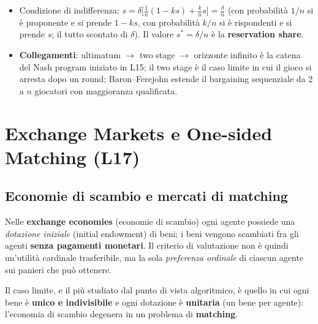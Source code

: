 \documentclass[12pt,a4paper,twoside]{book}
\theoremstyle{plain}
\theoremstyle{definition}
\begin{document}
\begin{itemize}
        approvazione di una maggioranza fissata di $k$ giocatori, sconto comune $\delta$,
        orizzonte infinito, strategie stazionarie. Il proponente offre $s$ a ciascuno dei $k$
        rispondenti.
  \item Condizione di indifferenza: $s=\delta\bigl[\frac1n(1-ks)+\frac kn s\bigr]=\frac{\delta}{n}$
        (con probabilità $1/n$ si è proponente e si prende $1-ks$, con probabilità $k/n$ si
        è rispondenti e si prende $s$; il tutto scontato di $\delta$). Il valore
        $s^*=\delta/n$ è la \textbf{reservation share}.
  \item \textbf{Collegamenti}: ultimatum $\to$ two stage $\to$ orizzonte infinito è la catena
        del Nash program iniziato in L15; il two stage è il caso limite in cui il gioco si
        arresta dopo un round; Baron--Ferejohn estende il bargaining sequenziale da 2 a $n$
        giocatori con maggioranza qualificata.
\end{itemize}


\chapter{Exchange Markets e One-sided Matching (L17)}
\label{ch:exchange-ttc}

\section{Economie di scambio e mercati di matching}

Nelle \textbf{exchange economies} (economie di scambio) ogni agente possiede una \emph{dotazione iniziale} (initial endowment) di beni; i beni vengono scambiati fra gli agenti \textbf{senza pagamenti monetari}. Il criterio di valutazione non è quindi un'utilità cardinale trasferibile, ma la sola \emph{preferenza ordinale} di ciascun agente sui panieri che può ottenere.

Il caso limite, e il più studiato dal punto di vista algoritmico, è quello in cui ogni bene è \textbf{unico e indivisibile} e ogni dotazione è \textbf{unitaria} (un bene per agente): l'economia di scambio degenera in un problema di \textbf{matching}.
\end{document}
